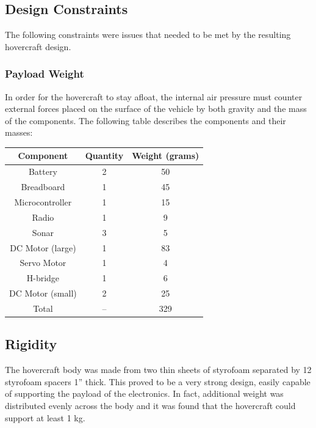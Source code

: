 \subsection{Design Constraints}
The following constraints were issues that needed to be met by the resulting hovercraft design.

\subsubsection{Payload Weight}
In order for the hovercraft to stay afloat, the internal air pressure must counter external forces placed on the surface of the vehicle by both gravity and the mass of the components. The following table describes the components and their masses:

\begin{minipage}{6.5in}
\begin{center}
\begin{tabular}{ c c c}
  Component & Quantity & Weight (grams) \\
  \hline
	Battery  &	2 & 	50 \\
	Breadboard &	1 &	45 \\
	Microcontroller &	1 &	15 \\
	Radio &	1 &	9 \\
	Sonar &	3 &	5 \\
	DC Motor (large) &	1 &	83 \\
	Servo Motor &	1 &	4 \\
	H-bridge &	1 &	6 \\
	DC Motor (small) &	2 &	25 \\
	Total &	-- &	329 \\
\end{tabular}
\end{center}
\label{restingTable}
\begin{minipage}{6.5in}

\subsection{Rigidity}
The hovercraft body was made from two thin sheets of styrofoam separated by 12 styrofoam spacers 1'' thick. This proved to be a very strong design, easily capable of supporting the payload of the electronics. In fact, additional weight was distributed evenly across the body and it was found that the hovercraft could support at least 1 kg.


\end{minipage}
\end{minipage}
